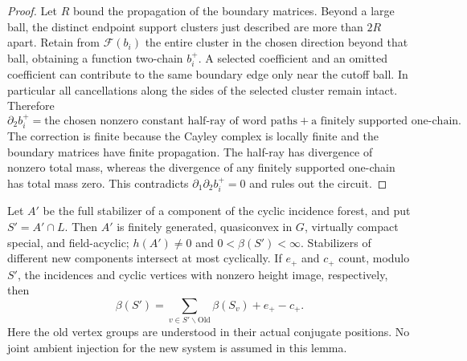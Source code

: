 \begin{proof}
Let $R$ bound the propagation of the boundary matrices. Beyond a
large ball, the distinct endpoint support clusters just described
are more than $2R$ apart. Retain from $\mathcal F(b_i)$ the entire
cluster in the chosen direction beyond that ball, obtaining a
function two-chain $b_i^+$. A selected coefficient and an omitted
coefficient can contribute to the same boundary edge only near the
cutoff ball. In particular all cancellations along the sides of the
selected cluster remain intact. Therefore
\[
 \partial_2 b_i^+
   =\text{the chosen nonzero constant half-ray of word paths}
      +\text{a finitely supported one-chain}.
\]
The correction is finite because the Cayley complex is locally finite
and the boundary matrices have finite propagation. The half-ray has
divergence of nonzero total mass, whereas the divergence of any
finitely supported one-chain has total mass zero. This contradicts
$\partial_1\partial_2b_i^+=0$ and rules out the circuit.
\end{proof}

\begin{lemma}\label{close:join-components}
Let $A'$ be the full stabilizer of a component of the cyclic incidence
forest, and put $S'=A'\cap L$. Then $A'$ is finitely generated,
quasiconvex in $G$, virtually compact special, and field-acyclic;
$h(A')\ne0$ and $0<\beta(S')<\infty$. Stabilizers of different new
components intersect at most cyclically. If $e_+$ and $c_+$ count,
modulo $S'$, the incidences and cyclic vertices with nonzero height
image, respectively, then
\begin{equation}\label{close:join-dimension}
 \beta(S')=\sum_{v\in S'\backslash\mathrm{Old}}
                    \beta(S_v)+e_+-c_+.
\end{equation}
Here the old vertex groups are understood in their actual conjugate
positions. No joint ambient injection for the new system is assumed
in this lemma.
\end{lemma}

